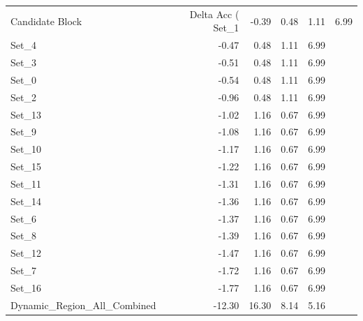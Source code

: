 \begin{tabular}{lrrrr}
\toprule
Candidate Block & Delta Acc (%
\midrule
Set_1 & -0.39 & 0.48 & 1.11 & 6.99 \\
Set_4 & -0.47 & 0.48 & 1.11 & 6.99 \\
Set_3 & -0.51 & 0.48 & 1.11 & 6.99 \\
Set_0 & -0.54 & 0.48 & 1.11 & 6.99 \\
Set_2 & -0.96 & 0.48 & 1.11 & 6.99 \\
Set_13 & -1.02 & 1.16 & 0.67 & 6.99 \\
Set_9 & -1.08 & 1.16 & 0.67 & 6.99 \\
Set_10 & -1.17 & 1.16 & 0.67 & 6.99 \\
Set_15 & -1.22 & 1.16 & 0.67 & 6.99 \\
Set_11 & -1.31 & 1.16 & 0.67 & 6.99 \\
Set_14 & -1.36 & 1.16 & 0.67 & 6.99 \\
Set_6 & -1.37 & 1.16 & 0.67 & 6.99 \\
Set_8 & -1.39 & 1.16 & 0.67 & 6.99 \\
Set_12 & -1.47 & 1.16 & 0.67 & 6.99 \\
Set_7 & -1.72 & 1.16 & 0.67 & 6.99 \\
Set_16 & -1.77 & 1.16 & 0.67 & 6.99 \\
Dynamic_Region_All_Combined & -12.30 & 16.30 & 8.14 & 5.16 \\
\bottomrule
\end{tabular}
